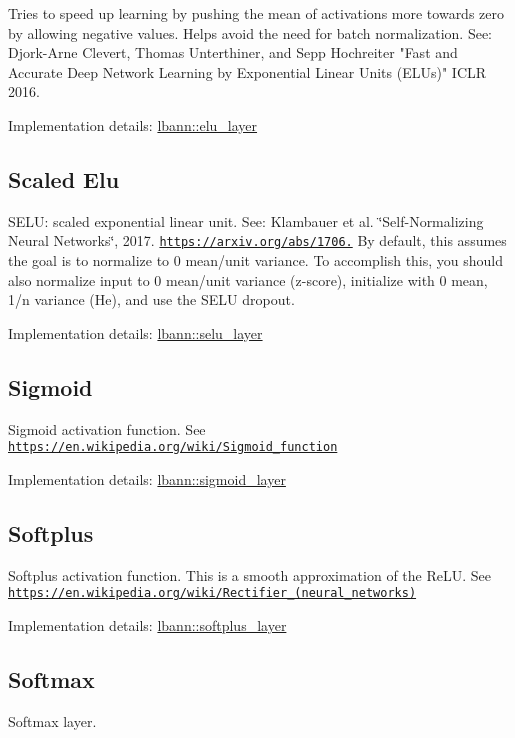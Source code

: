 Tries to speed up learning by pushing the mean of activations more towards zero by allowing negative values. Helps avoid the need for batch normalization. See\+: Djork-\/\+Arne Clevert, Thomas Unterthiner, and Sepp Hochreiter "Fast and Accurate Deep Network Learning by Exponential Linear Units (E\+L\+Us)" I\+C\+LR 2016.

Implementation details\+: \hyperlink{classlbann_1_1elu__layer}{lbann\+::elu\+\_\+layer}\hypertarget{layers_seluLayer}{}\subsection{Scaled Elu}\label{layers_seluLayer}
S\+E\+LU\+: scaled exponential linear unit. See\+: Klambauer et al. \char`\"{}\+Self-\/\+Normalizing Neural Networks\char`\"{}, 2017. \href{https://arxiv.org/abs/1706.02515}{\tt https\+://arxiv.\+org/abs/1706.} By default, this assumes the goal is to normalize to 0 mean/unit variance. To accomplish this, you should also normalize input to 0 mean/unit variance (z-\/score), initialize with 0 mean, 1/n variance (He), and use the S\+E\+LU dropout.

Implementation details\+: \hyperlink{classlbann_1_1selu__layer}{lbann\+::selu\+\_\+layer}\hypertarget{layers_sigLayer}{}\subsection{Sigmoid}\label{layers_sigLayer}
Sigmoid activation function. See \href{https://en.wikipedia.org/wiki/Sigmoid_function}{\tt https\+://en.\+wikipedia.\+org/wiki/\+Sigmoid\+\_\+function}

Implementation details\+: \hyperlink{classlbann_1_1sigmoid__layer}{lbann\+::sigmoid\+\_\+layer}\hypertarget{layers_softplus}{}\subsection{Softplus}\label{layers_softplus}
Softplus activation function. This is a smooth approximation of the Re\+LU. See \href{https://en.wikipedia.org/wiki/Rectifier_(neural_networks)}{\tt https\+://en.\+wikipedia.\+org/wiki/\+Rectifier\+\_\+(neural\+\_\+networks)}

Implementation details\+: \hyperlink{classlbann_1_1softplus__layer}{lbann\+::softplus\+\_\+layer}\hypertarget{layers_softmax}{}\subsection{Softmax}\label{layers_softmax}
Softmax layer.

